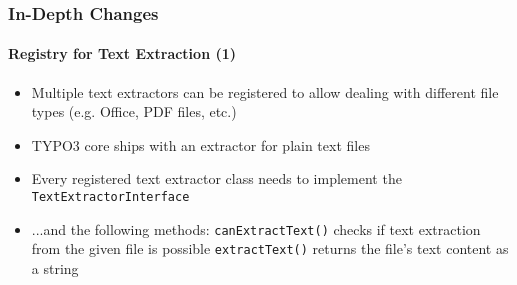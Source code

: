 \begin{frame}[fragile]
	\frametitle{In-Depth Changes}
	\framesubtitle{Registry for Text Extraction (1)}

	\lstset{basicstyle=\tiny\ttfamily}

	\begin{itemize}

		\item Multiple text extractors can be registered to allow dealing
			with different file types (e.g. Office, PDF files, etc.)

		\item TYPO3 core ships with an extractor for plain text files

		\item Every registered text extractor class needs to implement the \texttt{TextExtractorInterface}

		\item ...and the following methods:\newline
			\texttt{canExtractText()}\newline
			\small
				checks if text extraction from the given file is possible
			\normalsize
			\newline
			\texttt{extractText()}\newline
			\small
				returns the file's text content as a string
			\normalsize

	\end{itemize}

\end{frame}

